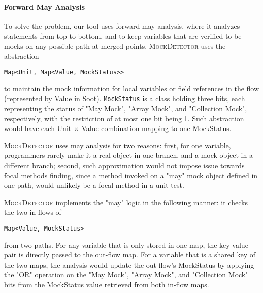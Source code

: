 



\paragraph{Forward May Analysis}
\label{subsubsec:forward}

To solve the problem, our tool uses forward may analysis, where it analyzes statements from top to bottom, and to keep variables that are verified to be mocks on any possible path at merged points. \textsc{MockDetector} uses the abstraction 

\begin{lstlisting}[basicstyle=\ttfamily\small,numbers=none]
Map<Unit, Map<Value, MockStatus>>
\end{lstlisting}
to maintain the mock information for local variables or field references in the flow (represented by Value in Soot). \texttt{MockStatus} is a class holding three bits, each representing the status of "May Mock", "Array Mock", and "Collection Mock", respectively, with the restriction of at most one bit being 1. Such abstraction would have each Unit $\times$ Value combination mapping to one MockStatus.

\textsc{MockDetector} uses may analysis for two reasons: first, for one variable, programmers rarely make it a real object in one branch, and a mock object in a different branch; second, such approximation would not impose issue towards focal methods finding, since a method invoked on a "may" mock object defined in one path, would unlikely be a focal method in a unit test. 

\textsc{MockDetector} implements the "may" logic in the following manner: it checks the two in-flows 
of \begin{lstlisting}[basicstyle=\ttfamily\small,numbers=none]
Map<Value, MockStatus>
\end{lstlisting}
from two paths. For any variable that is only stored in one map, the key-value pair is directly passed to the out-flow map. For a variable that is a shared key of the two maps, the analysis would update the out-flow's MockStatus by applying the "OR" operation on the "May Mock", "Array Mock", and "Collection Mock" bits from the MockStatus value retrieved from both in-flow maps. 

